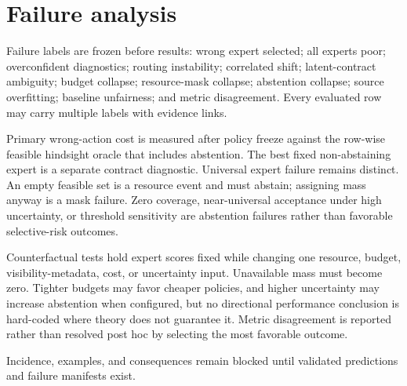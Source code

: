 \section{Failure analysis}



Failure labels are frozen before results: wrong expert selected; all experts poor; overconfident diagnostics; routing instability; correlated shift; latent-contract ambiguity; budget collapse; resource-mask collapse; abstention collapse; source overfitting; baseline unfairness; and metric disagreement. Every evaluated row may carry multiple labels with evidence links.

Primary wrong-action cost is measured after policy freeze against the row-wise feasible hindsight oracle that includes abstention. The best fixed non-abstaining expert is a separate contract diagnostic. Universal expert failure remains distinct. An empty feasible set is a resource event and must abstain; assigning mass anyway is a mask failure. Zero coverage, near-universal acceptance under high uncertainty, or threshold sensitivity are abstention failures rather than favorable selective-risk outcomes.

Counterfactual tests hold expert scores fixed while changing one resource, budget, visibility-metadata, cost, or uncertainty input. Unavailable mass must become zero. Tighter budgets may favor cheaper policies, and higher uncertainty may increase abstention when configured, but no directional performance conclusion is hard-coded where theory does not guarantee it. Metric disagreement is reported rather than resolved post hoc by selecting the most favorable outcome.

 Incidence, examples, and consequences remain blocked until validated predictions and failure manifests exist.
